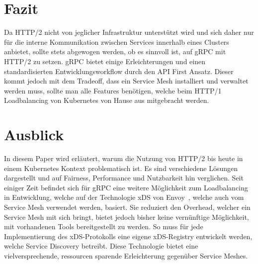 \documentclass[a4paper,12pt]{article}
\begin{document}
    \section{Fazit}\label{sec:fazit}

    Da HTTP/2 nicht von jeglicher Infrastruktur unterstützt wird und sich daher nur für die interne Kommunikation zwischen Services innerhalb eines Clusters anbietet, sollte stets abgewogen werden, ob es sinnvoll ist, auf gRPC mit HTTP/2 zu setzen.
    gRPC bietet einige Erleichterungen und einen standardisierten Entwicklungsworkflow durch den API First Ansatz.
    Dieser kommt jedoch mit dem Tradeoff, dass ein Service Mesh installiert und verwaltet werden muss, sollte man alle Features benötigen, welche beim HTTP/1 Loadbalancing von Kubernetes von Hause aus mitgebracht werden.

    \newpage

    \section{Ausblick}\label{sec:ausblick}

    In diesem Paper wird erläutert, warum die Nutzung von HTTP/2 bis heute in einem Kubernetes Kontext problematisch ist.
    Es sind verschiedene Lösungen dargestellt und auf Fairness, Performance und Nutzbarkeit hin verglichen.
    Seit einiger Zeit befindet sich für gRPC eine weitere Möglichkeit zum Loadbalancing in Entwicklung, welche auf der Technologie xDS von Envoy~\cite{xds}, welche auch vom Service Mesh verwendet werden, basiert.
    Sie reduziert den Overhead, welcher ein Service Mesh mit sich bringt, bietet jedoch bisher keine vernünftige Möglichkeit, mit vorhandenen Tools bereitgestellt zu werden.
    So muss für jede Implementierung des xDS-Protokolls eine eigene xDS-Registry entwickelt werden, welche Service Discovery betreibt.
    Diese Technologie bietet eine vielversprechende, ressourcen sparende Erleichterung gegenüber Service Meshes.

    \appendix

    \newpage

    
    
\end{document}
